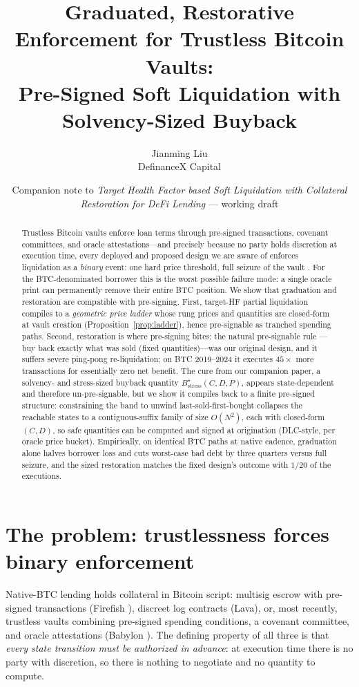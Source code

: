 \documentclass[12pt]{article}
\title{Graduated, Restorative Enforcement for Trustless Bitcoin Vaults:\\
Pre-Signed Soft Liquidation with Solvency-Sized Buyback}
\author{Jianming Liu\\DefinanceX Capital}
\date{Companion note to \emph{Target Health Factor based Soft Liquidation with
Collateral Restoration for DeFi Lending} --- working draft}
\begin{document}
\maketitle

\begin{abstract}
Trustless Bitcoin vaults enforce loan terms through pre-signed transactions,
covenant committees, and oracle attestations---and precisely because no party
holds discretion at execution time, every deployed and proposed design we are
aware of enforces liquidation as a \emph{binary} event: one hard price
threshold, full seizure of the vault \cite{babylon-trustless-vaults,firefish-protocol}.
For the BTC-denominated borrower this is the worst possible failure mode: a
single oracle print can permanently remove their entire BTC position. We show
that graduation and restoration are compatible with pre-signing. First,
target-HF partial liquidation compiles to a \emph{geometric price ladder} whose
rung prices and quantities are closed-form at vault creation
(Proposition~\ref{prop:ladder}), hence pre-signable as tranched spending paths.
Second, restoration is where pre-signing bites: the natural pre-signable rule
---buy back exactly what was sold (fixed quantities)---was our original design,
and it suffers severe ping-pong re-liquidation; on BTC 2019--2024 it executes
$45\times$ more transactions for essentially zero net benefit. The cure from
our companion paper, a solvency- and stress-sized buyback quantity
$B^{\star}_{\text{stress}}(C,D,P)$, appears state-dependent and therefore
un-pre-signable, but we show it compiles back to a finite pre-signed structure:
constraining the band to unwind last-sold-first-bought collapses the reachable
states to a contiguous-suffix family of size $O(N^2)$, each with closed-form
$(C,D)$, so safe quantities can be computed and signed at origination
(DLC-style, per oracle price bucket). Empirically, on identical BTC paths at
native cadence, graduation alone halves borrower loss and cuts worst-case bad
debt by three quarters versus full seizure, and the sized restoration matches
the fixed design's outcome with $1/20$ of the executions.
\end{abstract}

\section{The problem: trustlessness forces binary enforcement}
\label{sec:problem}

Native-BTC lending holds collateral in Bitcoin script: multisig escrow with
pre-signed transactions (Firefish \cite{firefish-protocol}), discreet log
contracts (Lava), or, most recently, trustless vaults combining pre-signed
spending conditions, a covenant committee, and oracle attestations
(Babylon \cite{babylon-trustless-vaults}). The defining property of all three
is that \emph{every state transition must be authorized in advance}: at
execution time there is no party with discretion, so there is nothing to
negotiate and no quantity to compute.
\end{document}
